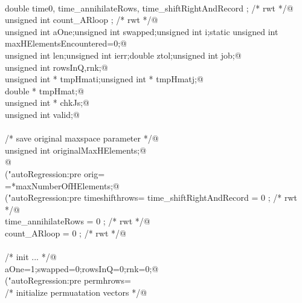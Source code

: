\documentclass[12pt]{article}
\begin{document}
\begin{flushleft}
\begin{minipage}{\linewidth}
\begin{list}{}{}
\mbox{}\verb@@\\
\mbox{}\verb@        double time0, time_annihilateRows, time_shiftRightAndRecord ; /* rwt */@\\
\mbox{}\verb@        unsigned int count_ARloop ; /* rwt */@\\
\mbox{}\verb@        unsigned int aOne;unsigned int swapped;unsigned int i;static unsigned int maxHElementsEncountered=0;@\\
\mbox{}\verb@        unsigned int len;unsigned int ierr;double ztol;unsigned int job;@\\
\mbox{}\verb@        unsigned int rowsInQ,rnk;@\\
\mbox{}\verb@        unsigned int * tmpHmati;unsigned int * tmpHmatj;@\\
\mbox{}\verb@        double * tmpHmat;@\\
\mbox{}\verb@        unsigned int * chkJs;@\\
\mbox{}\verb@        unsigned int valid;@\\
\mbox{}\verb@@\\
\mbox{}\verb@        /* save original maxspace parameter */@\\
\mbox{}\verb@        unsigned int originalMaxHElements;@\\
\mbox{}\verb@        @\\
\mbox{}\verb@printf("autoRegression:pre orig=%u\n",hrows);fflush(stdout);@\\
\mbox{}\verb@@\\
\mbox{}\verb@originalMaxHElements=*maxNumberOfHElements;@\\
\mbox{}\verb@printf("autoRegression:pre timeshifthrows=%u\n",hrows);fflush(stdout);@\\
\mbox{}\verb@        time_shiftRightAndRecord = 0 ;  /* rwt */@\\
\mbox{}\verb@        time_annihilateRows = 0 ;               /* rwt */@\\
\mbox{}\verb@        count_ARloop = 0 ;                              /* rwt */@\\
\mbox{}\verb@@\\
\mbox{}\verb@        /* init ... */@\\
\mbox{}\verb@        aOne=1;swapped=0;rowsInQ=0;rnk=0;@\\
\mbox{}\verb@printf("autoRegression:pre permhrows=%u\n",hrows);fflush(stdout);@\\
\mbox{}\verb@@\\
\mbox{}\verb@        /* initialize permuatation vectors */@\\

\end{list}
\end{minipage}
\end{flushleft}
\end{document}
